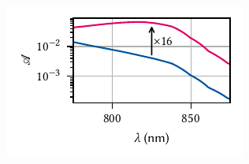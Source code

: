 \begin{margintable}
    \centering
    \footnotesize
    \caption{
        Absorptance $\mathscr{A}$ and reflectance $\mathscr{R}$ in the \gls{qw} for different configurations of the heterostructure.
        \enquote{Bare} is the standard structure without gate electrodes.
        \enquote{TG} and \enquote{BG} are with a gate on either the top or bottom side.
        \enquote{TG+BG} is with gates on both sides as on a trap site.
    }
    \label{tab:exp:tmm:absorptance_reflectance}
    
\end{margintable}

\begin{marginfigure}
    \centering
    \includegraphics{img/pdf/experiment/tmm_absorptance}
    \caption[]{
        \Gls{qw} absorptance \absorptance in a heterostructure with default (blue) and optimized (magenta) barrier thickness and top and bottom gates as function of wavelength.
        Optimization was performed at \qty{825}{\nano\meter} using the differential evolution algorithm implemented in \pymoosh, resulting in a barrier thickness of \qty{122}{\nano\meter} and an absorptance better by a factor of \num{16} at \qty{6.3}{\percent}.
    }
    \label{fig:exp:tmm:wavelengths}
\end{marginfigure}
\clearpage
